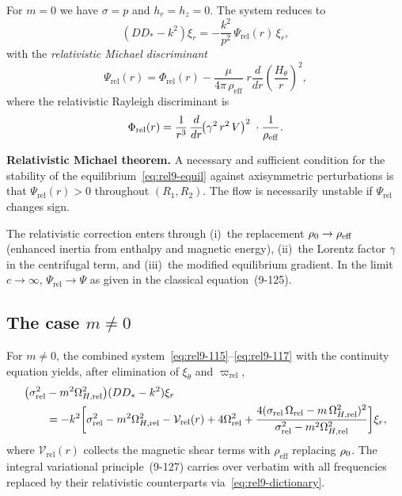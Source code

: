 For $m = 0$ we have $\sigma = p$ and $h_r = h_z = 0$.  The system
reduces to
\begin{equation}
  (DD_{*} - k^{2})\xi_r
  = -\frac{k^{2}}{p^{2}}\,\Psi_{\mathrm{rel}}(r)\,\xi_r,
  \label{eq:rel9-126}
\end{equation}
with the \emph{relativistic Michael discriminant}
\begin{equation}
  \Psi_{\mathrm{rel}}(r)
  = \Phi_{\mathrm{rel}}(r)
    - \frac{\mu}{4\pi\,\rho_{\mathrm{eff}}}\;
      r\frac{d}{dr}\!\left(\frac{H_\theta}{r}\right)^{2},
  \label{eq:rel9-Psi-rel}
\end{equation}
where the relativistic Rayleigh discriminant is
\begin{equation}
  \Phi_{\mathrm{rel}}(r)
  = \frac{1}{r^{3}}\,\frac{d}{dr}\!
    \bigl(\gamma^{2}\,r^{2}\,V\bigr)^{2}
    \;\cdot\frac{1}{\rho_{\mathrm{eff}}}.
  \label{eq:rel9-Phi-rel}
\end{equation}

\begin{relcorrection}
\textbf{Relativistic Michael theorem.}
A necessary and sufficient condition for the stability of the
equilibrium~\eqref{eq:rel9-equil} against axisymmetric perturbations
is that $\Psi_{\mathrm{rel}}(r) > 0$ throughout $(R_1,R_2)$.
The flow is necessarily unstable if $\Psi_{\mathrm{rel}}$
changes sign.

The relativistic correction enters through
(i)~the replacement $\rho_0 \to \rho_{\mathrm{eff}}$
(enhanced inertia from enthalpy and magnetic energy),
(ii)~the Lorentz factor $\gamma$ in the centrifugal term, and
(iii)~the modified equilibrium gradient.
In the limit $c \to \infty$,
$\Psi_{\mathrm{rel}} \to \Psi$ as given in the classical
equation~(9-125).
\end{relcorrection}

\subsection{The case $m \ne 0$}
\label{sec:rel9-84-mne0}

For $m \ne 0$, the combined system~\eqref{eq:rel9-115}--\eqref{eq:rel9-117}
with the continuity equation yields, after elimination of
$\xi_\theta$ and $\varpi_{\mathrm{rel}}$,
\begin{align}
  \bigl(\sigma_{\mathrm{rel}}^{2}
  &- m^{2}\Omega_{H,\mathrm{rel}}^{2}\bigr)
  (DD_{*}-k^{2})\xi_r \notag\\
  &= -k^{2}\biggl[\sigma_{\mathrm{rel}}^{2}
    - m^{2}\Omega_{H,\mathrm{rel}}^{2}
    - \mathcal{V}_{\mathrm{rel}}(r)
    + 4\Omega_{\mathrm{rel}}^{2}
    + \frac{4(\sigma_{\mathrm{rel}}\,\Omega_{\mathrm{rel}}
      - m\,\Omega_{H,\mathrm{rel}}^{2})^{2}}
         {\sigma_{\mathrm{rel}}^{2}
           - m^{2}\Omega_{H,\mathrm{rel}}^{2}}
  \biggr]\xi_r,
  \label{eq:rel9-127-rel}
\end{align}
where $\mathcal{V}_{\mathrm{rel}}(r)$ collects the magnetic
shear terms with $\rho_{\mathrm{eff}}$ replacing $\rho_0$.
The integral variational principle~(9-127) carries over verbatim
with all frequencies replaced by their relativistic counterparts
via~\eqref{eq:rel9-dictionary}.

